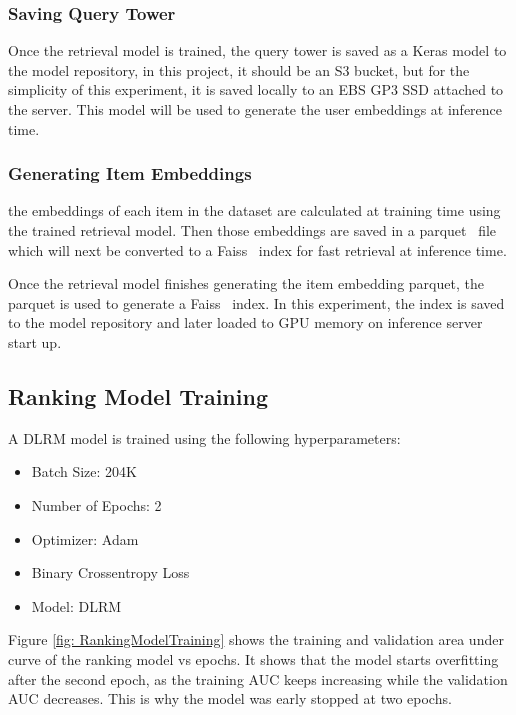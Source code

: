 \subsubsection{Saving Query Tower}

Once the retrieval model is trained, the query tower is saved as a Keras model to the model repository, 
in this project, it should be an S3 bucket, but for the simplicity of this experiment, it is saved locally to an EBS GP3 SSD attached to the server.
This model will be used to generate the user embeddings at inference time.

\subsubsection{Generating Item Embeddings}

the embeddings of each item in the dataset are calculated at training time using the trained retrieval model. 
Then those embeddings are saved in a parquet~\cite{ApacheParquet} file which will next be converted to a Faiss~\cite{Faiss} index for fast retrieval at inference time.

Once the retrieval model finishes generating the item embedding parquet,
the parquet is used to generate a Faiss~\cite{Faiss} index.
In this experiment, the index is saved to the model repository and later loaded to GPU memory on inference server start up.

\subsection{Ranking Model Training}

A DLRM model is trained using the following hyperparameters:

\begin{itemize}
\item Batch Size: 204K
\item Number of Epochs: 2
\item Optimizer: Adam
\item Binary Crossentropy Loss
\item Model: DLRM
\end{itemize}

Figure \ref{fig: RankingModelTraining} shows the training and validation area under curve of the ranking model vs epochs. It shows that the model starts overfitting after the second epoch, as the training AUC keeps increasing while the validation AUC decreases.
This is why the model was early stopped at two epochs.

